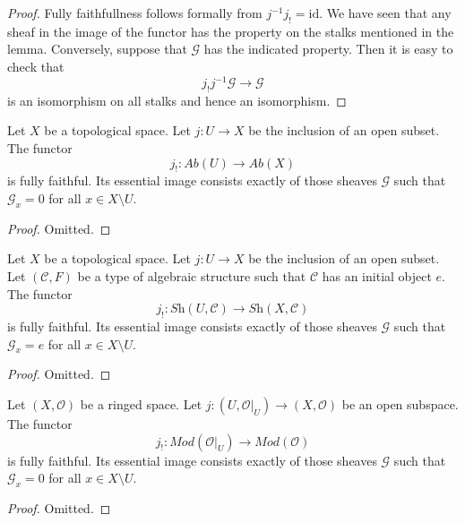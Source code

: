 \begin{proof}
Fully faithfullness follows formally from $j^{-1} j_! = \text{id}$.
We have seen that any sheaf in the image of the functor has
the property on the stalks mentioned in the lemma. Conversely, suppose
that $\mathcal{G}$ has the indicated property.
Then it is easy to check that
$$
j_! j^{-1} \mathcal{G} \to \mathcal{G}
$$
is an isomorphism on all stalks and hence an isomorphism.
\end{proof}

\begin{lemma}
\label{lemma-equivalence-categories-open-abelian}
Let $X$ be a topological space.
Let $j : U \to X$ be the inclusion of an open subset.
The functor
$$
j_! : \textit{Ab}(U) \longrightarrow \textit{Ab}(X)
$$
is fully faithful. Its essential image consists exactly
of those sheaves $\mathcal{G}$ such that
$\mathcal{G}_x = 0$ for all $x \in X \setminus U$.
\end{lemma}

\begin{proof}
Omitted.
\end{proof}

\begin{lemma}
\label{lemma-equivalence-categories-open-structures}
Let $X$ be a topological space.
Let $j : U \to X$ be the inclusion of an open subset.
Let $(\mathcal{C}, F)$ be a type of algebraic structure
such that $\mathcal{C}$ has an initial object $e$.
The functor
$$
j_! : \textit{Sh}(U, \mathcal{C}) \longrightarrow \textit{Sh}(X, \mathcal{C})
$$
is fully faithful. Its essential image consists exactly
of those sheaves $\mathcal{G}$ such that
$\mathcal{G}_x = e$ for all $x \in X \setminus U$.
\end{lemma}

\begin{proof}
Omitted.
\end{proof}


\begin{lemma}
\label{lemma-equivalence-categories-open-modules}
Let $(X, \mathcal{O})$ be a ringed space.
Let $j : (U, \mathcal{O}|_U) \to (X, \mathcal{O})$
be an open subspace.
The functor
$$
j_! : \textit{Mod}(\mathcal{O}|_U) \longrightarrow \textit{Mod}(\mathcal{O})
$$
is fully faithful. Its essential image consists exactly
of those sheaves $\mathcal{G}$ such that
$\mathcal{G}_x = 0$ for all $x \in X \setminus U$.
\end{lemma}

\begin{proof}
Omitted.
\end{proof}

